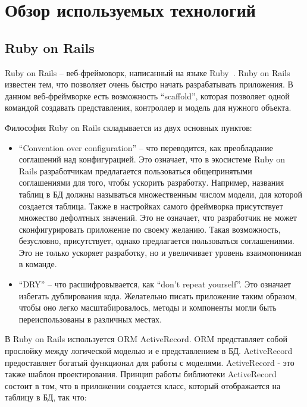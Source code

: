 \lstset{style=fsharpstyle}

\section{Обзор используемых технологий}
\label{sec:technologies}

\subsection{Ruby on Rails}
\label{sub:technologies:ruby_on_rails}
Ruby on Rails -- веб-фреймоворк, написанный на языке Ruby~\cite{ruby_documentation}. Ruby on Rails известен тем, что позволяет очень быстро начать разрабатывать приложения. В данном веб-фреймворке есть возможность ``scaffold'', которая позволяет одной командой создавать представления, контроллер и модель для нужного объекта.

Философия Ruby on Rails складывается из двух основных пунктов:

\begin{itemize}
  \item ``Convention over configuration'' -- что переводится, как преобладание соглашений над конфигурацией. Это означает, что в экосистеме Ruby on Rails разработчикам предлагается пользоваться общепринятыми соглашениями для того, чтобы ускорить разработку. Например, названия таблиц в БД должны называться множественным числом модели, для которой создается таблица. Также в настройках самого фреймворка присутствует множество дефолтных значений. Это не означает, что разработчик не может сконфигурировать приложение по своему желанию. Такая возможность, безусловно, присутствует, однако предлагается пользоваться соглашениями. Это не только ускоряет разработку, но и увеличивает уровень взаимопонимая в команде.
  \item ``DRY'' -- что расшифровывается, как ``don't repeat yourself''. Это означает избегать дублирования кода. Желательно писать приложение таким образом, чтобы оно легко масштабировалось, методы и компоненты могли быть переиспользованы в различных местах.
\end{itemize}

В Ruby on Rails используется ORM ActiveRecord. ORM представляет собой прослойку между логической моделью и е представлением в БД. ActiveRecord предоставляет богатый функционал для работы с моделями. ActiveRecord - это также шаблон проектирования. Принцип работы библиотеки ActiveRecord состоит в том, что в приложении создается класс, который отображается на таблицу в БД, так что:

